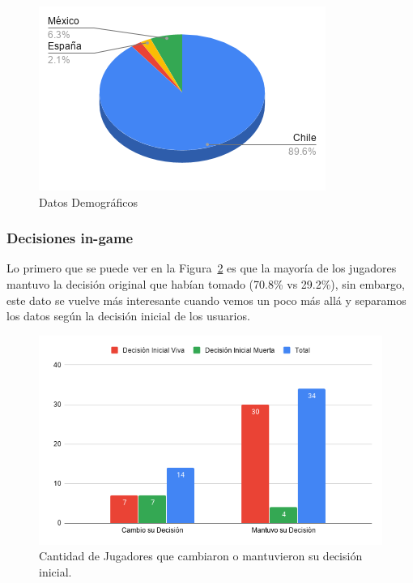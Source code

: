 \begin{figure}[h]
\begin{minipage}{.42\textwidth}
    \end{minipage}
    \begin{minipage}{.55\textwidth}
        \includegraphics[width=\textwidth]{imgs/chart-pais.png}
    \end{minipage}
    \caption{Datos Demográficos}
    \label{fig:demografia}
\end{figure}

\subsubsection{Decisiones in-game}

Lo primero que se puede ver en la Figura~\ref{fig:decision} es que la mayoría de los jugadores mantuvo la decisión original que habían tomado (70.8\% vs 29.2\%), sin embargo, este dato se vuelve más interesante cuando vemos un poco más allá y separamos los datos según la decisión inicial de los usuarios.

\begin{figure}[h]
    \centering
    \includegraphics[scale=0.7]{imgs/resultado-decision.png}
    \caption{Cantidad de Jugadores que cambiaron o mantuvieron su decisión inicial.}
    \label{fig:decision}
\end{figure}

